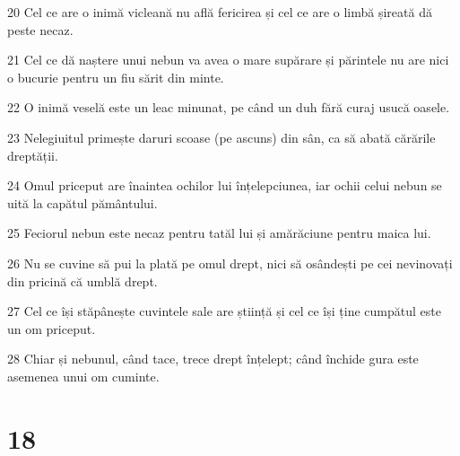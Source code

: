 \par 20 Cel ce are o inimă vicleană nu află fericirea și cel ce are o limbă șireată dă peste necaz.
\par 21 Cel ce dă naștere unui nebun va avea o mare supărare și părintele nu are nici o bucurie pentru un fiu sărit din minte.
\par 22 O inimă veselă este un leac minunat, pe când un duh fără curaj usucă oasele.
\par 23 Nelegiuitul primește daruri scoase (pe ascuns) din sân, ca să abată cărările dreptății.
\par 24 Omul priceput are înaintea ochilor lui înțelepciunea, iar ochii celui nebun se uită la capătul pământului.
\par 25 Feciorul nebun este necaz pentru tatăl lui și amărăciune pentru maica lui.
\par 26 Nu se cuvine să pui la plată pe omul drept, nici să osândești pe cei nevinovați din pricină că umblă drept.
\par 27 Cel ce își stăpânește cuvintele sale are știință și cel ce își ține cumpătul este un om priceput.
\par 28 Chiar și nebunul, când tace, trece drept înțelept; când închide gura este asemenea unui om cuminte.

\chapter{18}


